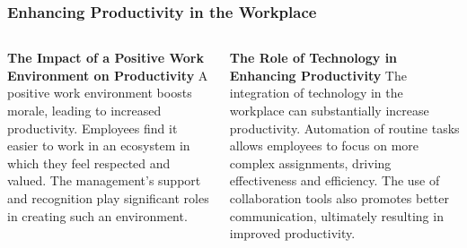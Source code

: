 \documentclass[5pt]{beamer}
\begin{document}
\begin{frame}
\frametitle{Enhancing Productivity in the Workplace}
\begin{columns}
\begin{column}{0.45\textwidth}
\begin{block}{\textbf{The Impact of a Positive Work Environment on Productivity}}
A positive work environment boosts morale, leading to increased productivity. Employees find it easier to work in an ecosystem in which they feel respected and valued. The management's support and recognition play significant roles in creating such an environment.
\end{block}
\end{column}
\begin{column}{0.45\textwidth}
\begin{block}{\textbf{The Role of Technology in Enhancing Productivity}}
The integration of technology in the workplace can substantially increase productivity. Automation of routine tasks allows employees to focus on more complex assignments, driving effectiveness and efficiency. The use of collaboration tools also promotes better communication, ultimately resulting in improved productivity.
\end{block}
\end{column}
\end{columns}
\end{frame}
\end{document}

